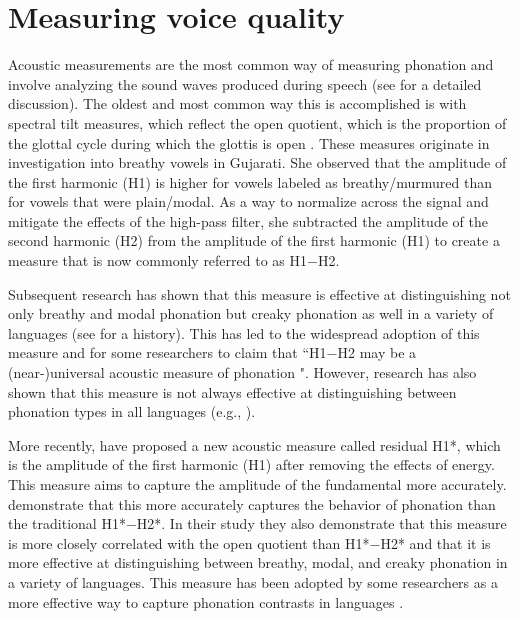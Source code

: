 \section{Measuring voice quality} \label{sec:measuring_voice_quality}

Acoustic measurements are the most common way of measuring phonation and involve analyzing the sound waves produced during speech (see \cite{garellekPhoneticsVoice2019} for a detailed discussion). The oldest and most common way this is accomplished is with spectral tilt measures, which reflect the open quotient, which is the proportion of the glottal cycle during which the glottis is open \citep{holmbergComparisonsAerodynamicElectroglottographic1995}. These measures originate in  investigation into breathy vowels in Gujarati. She observed that the amplitude of the first harmonic (H1) is higher for vowels labeled as breathy/murmured than for vowels that were plain/modal. As a way to normalize across the signal and mitigate the effects of the high-pass filter, she subtracted the amplitude of the second harmonic (H2) from the amplitude of the first harmonic (H1) to create a measure that is now commonly referred to as H1$-$H2.

Subsequent research has shown that this measure is effective at distinguishing not only breathy and modal phonation but creaky phonation as well in a variety of languages (see \cite{garellekTheoreticalAchievementsPhonetics2022} for a history). This has led to the widespread adoption of this measure and for some researchers to claim that ``H1$-$H2 may be a (near-)universal acoustic measure of phonation \citep[8]{espositoCrosslinguisticPatternsPhonation2020}". However, research has also shown that this measure is not always effective at distinguishing between phonation types in all languages (e.g., \cite{brinkerhoffUsingResidualH12025,chaiH1H2AcousticMeasure2022,espositoVariationContrastivePhonation2010,simpsonFirstSecondHarmonics2012}).

More recently, \citet{chaiH1H2AcousticMeasure2022} have proposed a new acoustic measure called residual H1*, which is the amplitude of the first harmonic (H1) after removing the effects of energy. This measure aims to capture the amplitude of the fundamental more accurately. \citeauthor{chaiH1H2AcousticMeasure2022} demonstrate that this more accurately captures the behavior of phonation than the traditional H1*$-$H2*. In their study they also demonstrate that this measure is more closely correlated with the open quotient than H1*$-$H2* and that it is more effective at distinguishing between breathy, modal, and creaky phonation in a variety of languages. This measure has been adopted by some researchers as a more effective way to capture phonation contrasts in languages \citep[e.g.,][]{brinkerhoffUsingResidualH12025,chaiPhoneticsPhonologyChecked2022,chaiPhoneticsGlottalizedPhonations2023}.


